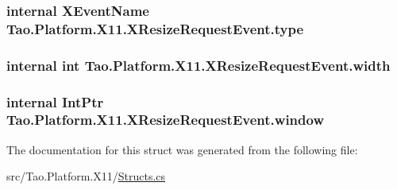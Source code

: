\label{struct_tao_1_1_platform_1_1_x11_1_1_x_resize_request_event_afdbba02f5fe8e7121d7727a17b541719}
\hypertarget{struct_tao_1_1_platform_1_1_x11_1_1_x_resize_request_event_a22f8e902e841d8f1121ba983a82e4964}{
\subsubsection[{type}]{\setlength{\rightskip}{0pt plus 5cm}internal {\bf XEventName} {\bf Tao.Platform.X11.XResizeRequestEvent.type}}}
\label{struct_tao_1_1_platform_1_1_x11_1_1_x_resize_request_event_a22f8e902e841d8f1121ba983a82e4964}
\hypertarget{struct_tao_1_1_platform_1_1_x11_1_1_x_resize_request_event_a05652c9373f5c5efca32c6b4cf555985}{
\subsubsection[{width}]{\setlength{\rightskip}{0pt plus 5cm}internal int {\bf Tao.Platform.X11.XResizeRequestEvent.width}}}
\label{struct_tao_1_1_platform_1_1_x11_1_1_x_resize_request_event_a05652c9373f5c5efca32c6b4cf555985}
\hypertarget{struct_tao_1_1_platform_1_1_x11_1_1_x_resize_request_event_a4e20de1f70e1a5c1a30e6419c88c7af6}{
\subsubsection[{window}]{\setlength{\rightskip}{0pt plus 5cm}internal IntPtr {\bf Tao.Platform.X11.XResizeRequestEvent.window}}}
\label{struct_tao_1_1_platform_1_1_x11_1_1_x_resize_request_event_a4e20de1f70e1a5c1a30e6419c88c7af6}


The documentation for this struct was generated from the following file:\begin{DoxyCompactItemize}
\item 
src/Tao.Platform.X11/\hyperlink{_structs_8cs}{Structs.cs}\end{DoxyCompactItemize}
